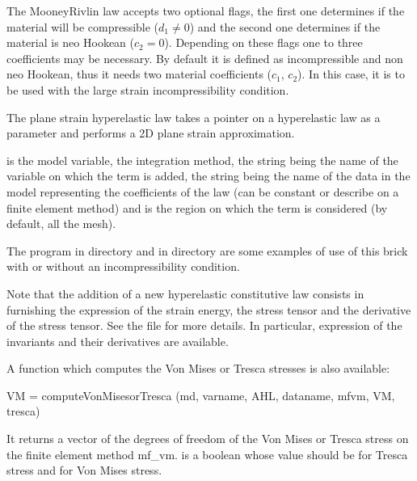 \documentclass[a4paper,11pt,english]{sphinxmanual}
\begin{document}
The Mooney\sphinxhyphen{}Rivlin law accepts two optional flags, the first one determines if the material will be compressible (\(d_1 \neq 0\)) and the second one determines if the material is neo Hookean (\(c_2 = 0\)). Depending on these flags one to three coefficients may be necessary. By default it is defined as incompressible and non neo Hookean, thus it needs two material coefficients (\(c_1\), \(c_2\)). In this case, it is to be used with the large strain incompressibility condition.

The plane strain hyperelastic law takes a pointer on a hyperelastic law as a parameter and performs a 2D plane strain approximation.

 is the model variable,  the integration method,  the string being the name of the variable on which the term is added,  the string being the name of the data in the model representing the coefficients of the law (can be constant or describe on a finite element method) and  is the region on which the term is considered (by default, all the mesh).

The program  in  directory and  in  directory are some examples of use of this brick with or without an incompressibility condition.

Note that the addition of a new hyperelastic constitutive law consists in furnishing the expression of the strain energy, the stress tensor and the derivative of the stress tensor. See the file   for more details. In particular, expression of the invariants and their derivatives are available.

A function which computes the Von Mises or Tresca stresses is also available:

\begin{sphinxVerbatim}[commandchars=\\\{\}]
VM = compute\PYGZus{}Von\PYGZus{}Mises\PYGZus{}or\PYGZus{}Tresca
  (md, varname, AHL, dataname, mf\PYGZus{}vm, VM, tresca)
\end{sphinxVerbatim}

It returns a vector of the degrees of freedom of the Von Mises or Tresca stress on the finite element method mf\_vm.  is a boolean whose value should be  for Tresca stress and  for Von Mises stress.
\end{document}
